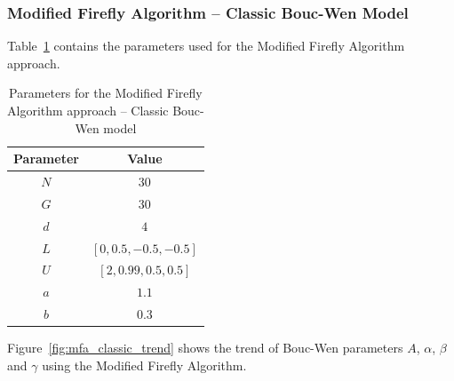 \subsubsection{Modified Firefly Algorithm -- Classic Bouc-Wen Model}

Table~\ref{tab:mfa_classic_params} contains the parameters used for the
Modified Firefly Algorithm approach. 

\begin{table}[H]
	\centering
	\begin{tabular}{c c}
		\toprule
		\textbf{Parameter} & \textbf{Value} \\ \toprule
		$N$			& $30$ \\
		$G$			& $30$ \\
		$d$			& $4$  \\
		$L$			& $\left[0, 0.5, -0.5, -0.5\right]$ \\
		$U$			& $\left[2, 0.99, 0.5, 0.5\right]$ \\ 
		$a$			& $1.1$ \\
		$b$			& $0.3$ \\ \bottomrule
	\end{tabular}
	\caption{Parameters for the Modified Firefly Algorithm approach -- Classic Bouc-Wen model}
	\label{tab:mfa_classic_params}
\end{table}

Figure~\ref{fig:mfa_classic_trend} shows the trend of Bouc-Wen parameters
$A$, $\alpha$, $\beta$ and $\gamma$ using the Modified Firefly Algorithm.

